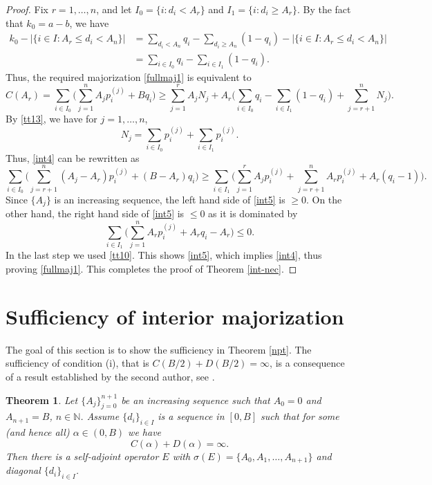 \documentclass[12pt]{amsart}
\newcounter{Theorem}
\numberwithin{equation}{section}
\numberwithin{Theorem}{section}
\theoremstyle{plain}
\newtheorem{thm}[Theorem]{Theorem}
\theoremstyle{definition}
\theoremstyle{remark}
\begin{document}
\begin{proof}
Fix $r=1,\ldots,n$, and let $I_{0} = \{i:d_{i}<A_r\}$ and $I_{1} = \{i:d_{i}\geq A_r\}$. By the fact that $k_0=a-b$, we have
\[
\begin{aligned}
k_0- |\{i\in I: A_r \le d_i < A_n \}| 
& = \sum_{d_i < A_n} q_i - \sum_{d_i \ge A_n} (1-q_i) - |\{i\in I: A_r \le d_i < A_n \}|  
\\
& =\sum_{i\in I_0} q_i - \sum_{i\in I_1} (1-q_i).
\end{aligned}
\]
Thus, the required majorization \eqref{fullmaj1} is equivalent to
\begin{equation}\label{int4}
C(A_r)=\sum_{i\in I_0}\bigg( \sum_{j=1}^n 
 A_j p_i^{(j)} +
 Bq_i \bigg) \ge \sum_{j=1}^{r}A_{j} N_j + A_{r} \bigg(\sum_{i\in I_0} q_i - \sum_{i\in I_1} (1-q_i)  + \sum_{j=r+1}^{n}N_{j}\bigg).
\end{equation}
By \eqref{tt13}, we have for $j=1,\ldots,n$,
\[
N_j = \sum_{i\in I_0} p_i^{(j)} + \sum_{i\in I_1} p_i^{(j)}.
\]
Thus, \eqref{int4} can be rewritten as
\begin{equation}\label{int5}
\sum_{i\in I_0}\bigg( \sum_{j=r+1}^{n} (A_j -A_r) p_i^{(j)} + (B-A_r)q_i \bigg) 
\ge \sum_{i\in I_1} \bigg( 
 \sum_{j=1}^{r}A_{j} p_i^{(j)}+ 
 \sum_{j=r+1}^{n} A_r p_i^{(j)}
 + A_{r} (q_i-1)  \bigg).
\end{equation}
Since $\{A_j\}$ is an increasing sequence, the left hand side of \eqref{int5} is $\ge 0$. On the other hand, the right hand side of \eqref{int5} is $\le 0$ as it is dominated by
\[
\sum_{i\in I_1} \bigg( 
 \sum_{j=1}^{n}A_r p_i^{(j)}+ A_{r} q_i-A_r  \bigg) \le 0.
\]
In the last step we used \eqref{tt10}. This shows \eqref{int5}, which implies \eqref{int4}, thus proving \eqref{fullmaj1}. This completes the proof of Theorem \ref{int-nec}.
\end{proof}

\section{Sufficiency of interior majorization}

The goal of this section is to show the sufficiency in Theorem \ref{npt}. The sufficiency of condition (i), that is $C(B/2)+D(B/2)=\infty$, is a consequence of a result established by the second author, see \cite[Corollary 4.5]{jj}.

\begin{thm}\label{3intsuff} Let $\{A_j\}_{j=0}^{n+1}$ be an increasing sequence such that $A_0=0$ and $A_{n+1}=B$, $n\in {\mathbb{N}}$. Assume $\{d_{i}\}_{i\in I}$ is a sequence in $[0,B]$ such that for some (and hence all) $\alpha\in (0,B)$ we have
\[
C(\alpha) + D(\alpha)=\infty.
\]
Then there is a self-adjoint operator $E$ with $\sigma(E)=\{A_0,A_1,\ldots,A_{n+1}\}$ and diagonal $\{d_{i}\}_{i\in I}$.
\end{thm}
\end{document}
